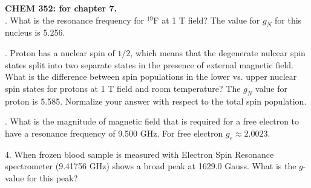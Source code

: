\noindent
\textbf{CHEM 352:
 for chapter 7.}\\

. What is the resonance frequency for $^{19}$F at 1 T field? The value for $g_N$ for this nucleus is 5.256.\\


. Proton has a nuclear spin of $1/2$, which means that the degenerate nulcear spin states split into two separate states in the presence of 
external magnetic field. What is the difference between spin populations in the lower vs. upper nuclear spin states for protons 
at 1 T field and room temperature? The $g_N$ value for proton is 5.585. Normalize your answer with respect to the total spin population.\\


. What is the magnitude of magnetic field that is required for a free electron to have a resonance frequency of 9.500 GHz. 
For free electron $g_e \approx 2.0023$.\\


4. When frozen blood sample is measured with Electron Spin Resonance spectrometer (9.41756 GHz) shows a broad peak at 1629.0 Gauss.
What is the $g$-value for this peak?\\

 
